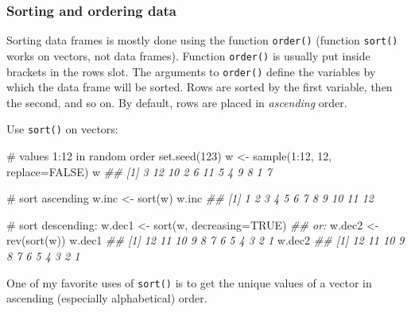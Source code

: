 \documentclass[
  13,
  letterpaper,
]{report}
\newenvironment{Shaded}{\begin{snugshade}}{\end{snugshade}}
\newcommand{\AttributeTok}[1]{\textcolor[rgb]{0.40,0.45,0.13}{#1}}
\newcommand{\CommentTok}[1]{\textcolor[rgb]{0.37,0.37,0.37}{#1}}
\newcommand{\ConstantTok}[1]{\textcolor[rgb]{0.56,0.35,0.01}{#1}}
\newcommand{\DecValTok}[1]{\textcolor[rgb]{0.68,0.00,0.00}{#1}}
\newcommand{\DocumentationTok}[1]{\textcolor[rgb]{0.37,0.37,0.37}{\textit{#1}}}
\newcommand{\FunctionTok}[1]{\textcolor[rgb]{0.28,0.35,0.67}{#1}}
\newcommand{\NormalTok}[1]{\textcolor[rgb]{0.00,0.23,0.31}{#1}}
\newcommand{\OtherTok}[1]{\textcolor[rgb]{0.00,0.23,0.31}{#1}}
\newcommand{\SpecialCharTok}[1]{\textcolor[rgb]{0.37,0.37,0.37}{#1}}
\begin{document}
\subsubsection{Sorting and ordering data}\label{sec-05-df-com-sort}

Sorting data frames is mostly done using the function \texttt{order()}
(function \texttt{sort()} works on vectors, not data frames). Function
\texttt{order()} is usually put inside brackets in the rows slot. The
arguments to \texttt{order()} define the variables by which the data
frame will be sorted. Rows are sorted by the first variable, then the
second, and so on. By default, rows are placed in \emph{ascending}
order.

Use \texttt{sort()} on vectors:

\begin{Shaded}
\begin{Highlighting}[]
\CommentTok{\# values 1:12 in random order}
\FunctionTok{set.seed}\NormalTok{(}\DecValTok{123}\NormalTok{)}
\NormalTok{w }\OtherTok{\textless{}{-}} \FunctionTok{sample}\NormalTok{(}\DecValTok{1}\SpecialCharTok{:}\DecValTok{12}\NormalTok{, }\DecValTok{12}\NormalTok{, }\AttributeTok{replace=}\ConstantTok{FALSE}\NormalTok{)}
\NormalTok{w}
\DocumentationTok{\#\#  [1]  3 12 10  2  6 11  5  4  9  8  1  7}

\CommentTok{\# sort ascending}
\NormalTok{w.inc }\OtherTok{\textless{}{-}} \FunctionTok{sort}\NormalTok{(w)}
\NormalTok{w.inc}
\DocumentationTok{\#\#  [1]  1  2  3  4  5  6  7  8  9 10 11 12}

\CommentTok{\# sort descending:}
\NormalTok{w.dec1 }\OtherTok{\textless{}{-}} \FunctionTok{sort}\NormalTok{(w, }\AttributeTok{decreasing=}\ConstantTok{TRUE}\NormalTok{)}
\DocumentationTok{\#\# or:}
\NormalTok{w.dec2 }\OtherTok{\textless{}{-}} \FunctionTok{rev}\NormalTok{(}\FunctionTok{sort}\NormalTok{(w))}
\NormalTok{w.dec1}
\DocumentationTok{\#\#  [1] 12 11 10  9  8  7  6  5  4  3  2  1}
\NormalTok{w.dec2}
\DocumentationTok{\#\#  [1] 12 11 10  9  8  7  6  5  4  3  2  1}
\end{Highlighting}
\end{Shaded}

One of my favorite uses of \texttt{sort()} is to get the unique values
of a vector in ascending (especially alphabetical) order.
\end{document}
